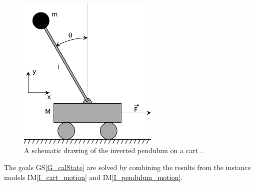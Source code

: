 \documentclass[12pt]{article}
\newcommand{\gsref}[1]{GS\ref{#1}}
\newcommand{\iref}[1]{IM\ref{#1}}
\begin{document}
\begin{figure}[h!]
  \begin{center}
   \includegraphics[width=0.6\textwidth]{Cart-pendulum}
  \caption{A schematic drawing of the inverted pendulum on a cart \cite{wiki_inverted_pendulum_2024}.}
  \label{Fig_InvertedPendulumSchematic} 
  \end{center}
\end{figure}

The goals \gsref{G_calState} are solved by combining the results from the
instance models \iref{I_cart_motion} and \iref{I_pendulum_motion}.

~\newline

\end{document}
